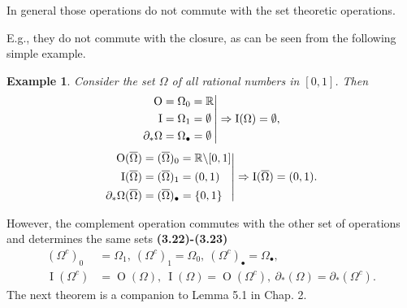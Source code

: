 \documentclass{book}
\numberwithin{equation}{section}
\newtheorem{example}{Example}[section]
\begin{document}
\begin{enumerate}
    In general those operations do not commute with the set theoretic operations.
    
    E.g., they do not commute with the closure, as can be seen from the following simple example.
    
    \begin{example}
        Consider the set $\Omega$ of all rational numbers in $[0,1]$. Then
        \begin{equation*}
            \left.\begin{split}
                {\rm O} &= \Omega_0 = \mathbb{R}\\
                {\rm I} &= \Omega_1 = \emptyset\\
                \partial_*\Omega &= \Omega_\bullet = \emptyset
            \end{split}\right|\Rightarrow\operatorname{I}(\Omega) = \emptyset,
        \end{equation*}
        \begin{equation*}
            \left.\begin{split}
                {\rm O}(\overline{\Omega}) &= (\overline{\Omega})_0 = \mathbb{R}\backslash[0,1]\\
                {\rm I}(\overline{\Omega}) &= (\overline{\Omega})_1 = (0,1)\\
                \partial_*\Omega(\overline{\Omega}) &= (\overline{\Omega})_\bullet = \{0,1\}
            \end{split}\right|\Rightarrow\operatorname{I}(\overline{\Omega}) = (0,1).
        \end{equation*}
    \end{example}
    However, the complement operation commutes with the other set of operations and determines the same sets \textbf{(3.22)-(3.23)}
    \begin{align*}
        (\Omega^c)_0 &= \Omega_1,\ (\Omega^c)_1 = \Omega_0,\ (\Omega^c)_\bullet = \Omega_\bullet,\\
        \operatorname{I}(\Omega^c) &= \operatorname{O}(\Omega),\ \operatorname{I}(\Omega) = \operatorname{O}(\Omega^c),\ \partial_*(\Omega) = \partial_*(\Omega^c).
    \end{align*}
    The next theorem is a companion to Lemma 5.1 in Chap. 2.
    

\end{enumerate}
\end{document}
